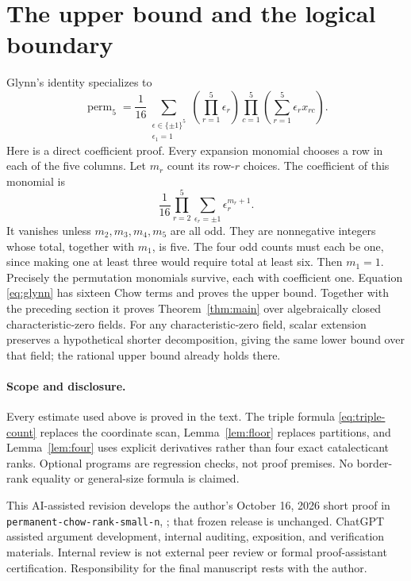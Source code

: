 \documentclass[11pt]{amsart}
\theoremstyle{remark}
\numberwithin{equation}{section}
\newcommand{\perm}{\operatorname{perm}}
\begin{document}
\section{The upper bound and the logical boundary}
Glynn's identity \cite{Glynn2010} specializes to
\begin{equation}\label{eq:glynn}
 \perm_5=\frac1{16}
 \sum_{\substack{\epsilon\in\{\pm1\}^5\\\epsilon_1=1}}
 \left(\prod_{r=1}^5\epsilon_r\right)
 \prod_{c=1}^5\left(\sum_{r=1}^5\epsilon_rx_{rc}\right).
\end{equation}
Here is a direct coefficient proof. Every expansion monomial chooses a
row in each of the five columns. Let \(m_r\) count its row-\(r\)
choices. The coefficient of this monomial is
\[
 \frac1{16}\prod_{r=2}^5\sum_{\epsilon_r=\pm1}\epsilon_r^{m_r+1}.
\]
It vanishes unless \(m_2,m_3,m_4,m_5\) are all odd. They are
nonnegative integers whose total, together with \(m_1\), is five.
The four odd counts must each be one, since making one at least three
would require total at least six. Then \(m_1=1\). Precisely the
permutation monomials survive, each with coefficient one. Equation
\eqref{eq:glynn} has sixteen Chow terms and proves the upper bound.
Together with the preceding section it proves Theorem~\ref{thm:main}
over algebraically closed characteristic-zero fields. For any
characteristic-zero field, scalar extension preserves a hypothetical
shorter decomposition, giving the same lower bound over that field;
the rational upper bound already holds there.

\paragraph{Scope and disclosure.}
Every estimate used above is proved in the text. The triple formula
\eqref{eq:triple-count} replaces the coordinate scan,
Lemma~\ref{lem:floor} replaces partitions, and Lemma~\ref{lem:four}
uses explicit derivatives rather than four exact catalecticant ranks.
Optional programs are regression checks, not proof premises. No border-rank
equality or general-size formula is claimed.

This AI-assisted revision develops the author's October 16, 2026 short
proof in \texttt{permanent-chow-rank-small-n},
; that frozen release is
unchanged. ChatGPT assisted argument development, internal auditing,
exposition, and verification materials. Internal review is not external
peer review or formal proof-assistant certification. Responsibility for
the final manuscript rests with the author.
\end{document}
